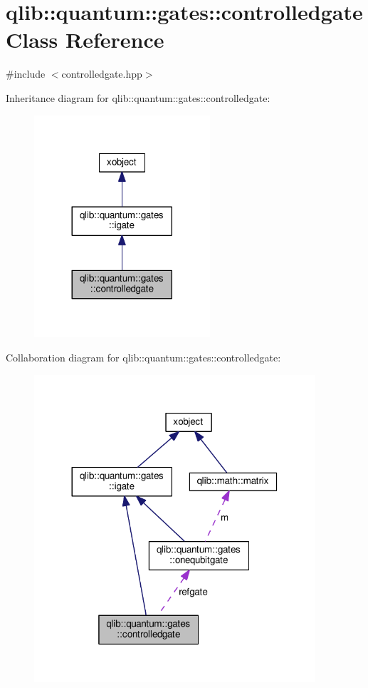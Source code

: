 \hypertarget{classqlib_1_1quantum_1_1gates_1_1controlledgate}{}\section{qlib\+:\+:quantum\+:\+:gates\+:\+:controlledgate Class Reference}
\label{classqlib_1_1quantum_1_1gates_1_1controlledgate}


{\ttfamily \#include $<$controlledgate.\+hpp$>$}



Inheritance diagram for qlib\+:\+:quantum\+:\+:gates\+:\+:controlledgate\+:\nopagebreak
\begin{figure}[H]
\begin{center}
\leavevmode
\includegraphics[width=185pt]{classqlib_1_1quantum_1_1gates_1_1controlledgate__inherit__graph}
\end{center}
\end{figure}


Collaboration diagram for qlib\+:\+:quantum\+:\+:gates\+:\+:controlledgate\+:\nopagebreak
\begin{figure}[H]
\begin{center}
\leavevmode
\includegraphics[width=296pt]{classqlib_1_1quantum_1_1gates_1_1controlledgate__coll__graph}
\end{center}
\end{figure}
